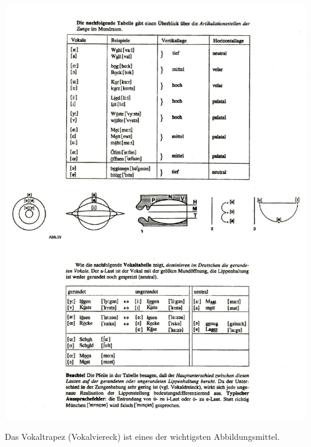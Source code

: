 \documentclass[
  letterpaper,
]{scrbook}
\begin{document}
\includegraphics[width=1\textwidth,height=\textheight]{./pictures/02a_Gehrmann-Sprechwerkzeuge_Vokale_page-0003.jpg}

Das Vokaltrapez (Vokalviereck) ist eines der wichtigsten
Abbildungsmittel.
\end{document}
